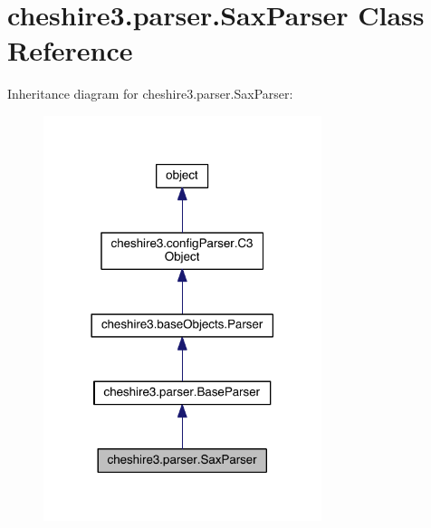 \hypertarget{classcheshire3_1_1parser_1_1_sax_parser}{\section{cheshire3.\-parser.\-Sax\-Parser Class Reference}
\label{classcheshire3_1_1parser_1_1_sax_parser}
}


Inheritance diagram for cheshire3.\-parser.\-Sax\-Parser\-:
\nopagebreak
\begin{figure}[H]
\begin{center}
\leavevmode
\includegraphics[width=230pt]{classcheshire3_1_1parser_1_1_sax_parser__inherit__graph}
\end{center}
\end{figure}


